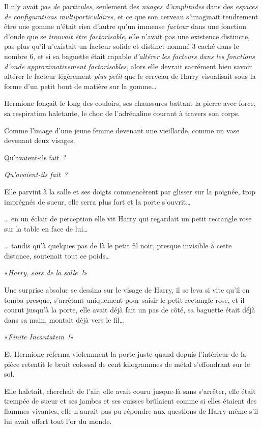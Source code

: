 Il n'y avait \emph{pas de particules}, seulement des \emph{nuages d'amplitudes} dans des \emph{espaces de configurations multiparticulaires}, et ce que son cerveau s'imaginait tendrement être une gomme n'était rien d'autre qu'un immense \emph{facteur} dans une fonction d'onde que se \emph{trouvait être factorisable}, elle n'avait pas une existence distincte, pas plus qu'il n'existait un facteur solide et distinct nommé 3 caché dans le nombre 6, et si sa baguette était capable \emph{d'altérer les facteurs dans les fonctions d'onde approximativement factorisables}, alors elle devrait sacrément bien savoir altérer le facteur légèrement \emph{plus petit} que le cerveau de Harry visualisait sous la forme d'un petit bout de matière sur la gomme…

\later

Hermione fonçait le long des couloirs, ses chaussures battant la pierre avec force, sa respiration haletante, le choc de l'adrénaline courant à travers son corps.

Comme l'image d'une jeune femme devenant une vieillarde, comme un vase devenant deux visages.

Qu'avaient-ils fait~?

\emph{Qu'avaient-ils fait~?}

Elle parvint à la salle et ses doigts commencèrent par glisser sur la poignée, trop imprégnés de sueur, elle serra plus fort et la porte s'ouvrit…

… en un éclair de perception elle vit Harry qui regardait un petit rectangle rose sur la table en face de lui…

… tandis qu'à quelques pas de là le petit fil noir, presque invisible à cette distance, soutenait tout ce poids…

«\emph{Harry, sors de la salle~!}»

Une surprise absolue se dessina sur le visage de Harry, il se leva si vite qu'il en tomba presque, s'arrêtant uniquement pour saisir le petit rectangle rose, et il courut jusqu'à la porte, elle avait déjà fait un pas de côté, sa baguette était déjà dans sa main, montait déjà vers le fil…

«\emph{Finite Incantatem~!}»

Et Hermione referma violemment la porte juste quand depuis l'intérieur de la pièce retentit le bruit colossal de cent kilogrammes de métal s'effondrant sur le sol.

Elle haletait, cherchait de l'air, elle avait couru jusque-là sans s'arrêter, elle était trempée de sueur et ses jambes et ses cuisses brûlaient comme si elles étaient des flammes vivantes, elle n'aurait pas pu répondre aux questions de Harry même s'il lui avait offert tout l'or du monde.

